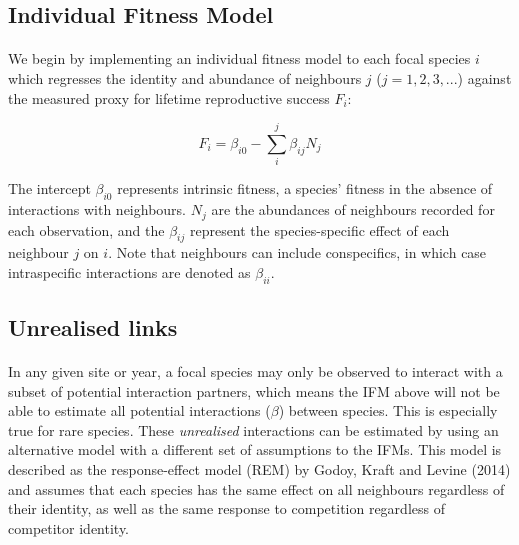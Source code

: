 \documentclass[a4,12pt]{article}
\begin{document}
    \subsection{Individual Fitness Model}
        
        \paragraph{}
        We begin by implementing an individual fitness model to each focal species $i$ which regresses the identity and abundance of neighbours $j$ ($j = 1, 2, 3, ...$) against the measured proxy for lifetime reproductive success $F_{i}$:
        
        \begin{equation}
        F_{i} = \beta_{i0} - \sum_{i}^{j} \beta_{ij} N_{j}
        \label{ifm}
        \end{equation}
        
        The intercept $\beta_{i0}$ represents intrinsic fitness, a species' fitness in the absence of interactions with neighbours. $N_{j}$ are the abundances of neighbours recorded for each observation, and the $\beta_{ij}$ represent the species-specific effect of each neighbour $j$ on $i$. Note that neighbours can include conspecifics, in which case intraspecific interactions are denoted as $\beta_{ii}$.
              
    \subsection{Unrealised links}
    
        \paragraph{}
        In any given site or year, a focal species may only be observed to interact with a subset of potential interaction partners, which means the IFM above will not be able to estimate all potential interactions ($\beta$) between species. This is especially true for rare species. 
        These \textit{unrealised} interactions can be estimated by using an alternative model with a different set of assumptions to the IFMs. This model is described as the response-effect model (REM) by Godoy, Kraft and Levine (2014) and assumes that each species has the same effect on all neighbours regardless of their identity, as well as the same response to competition regardless of competitor identity. 
        
\end{document}
